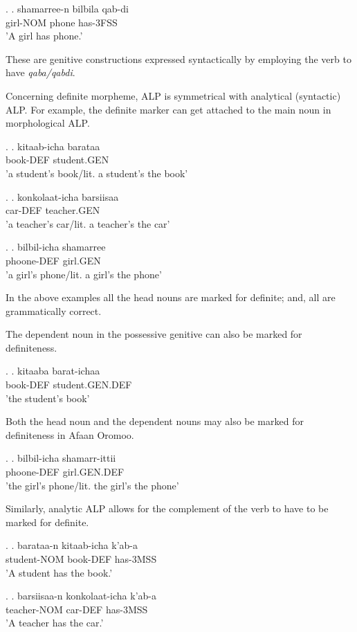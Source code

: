 \documentclass[11pt,a4paper]{article}
\begin{document}
	\ex.
	\ag.
	shamarree-n bilbila qab-di\\
	girl-NOM phone has-3FSS\\
	'A girl has phone.'
	
	These are genitive constructions expressed syntactically by employing the verb to have \emph{qaba/qabdi}.
	
	Concerning definite morpheme,  ALP is symmetrical with analytical (syntactic) ALP. For example, the definite marker can get attached to the main noun in morphological ALP. 
	
	\ex.
	\ag.
	kitaab-icha barataa\\
	book-DEF student.GEN\\
	'a student's book/lit. a student's the book'
	
	\ex.
	\ag.
	konkolaat-icha barsiisaa\\
	car-DEF teacher.GEN\\
	'a teacher's car/lit. a teacher's the car'
	
	\ex.
	\ag.
	bilbil-icha shamarree\\
	phoone-DEF girl.GEN\\
	'a girl's phone/lit. a girl's the phone'
	
	In the above examples all the head nouns are marked for definite; and, all are grammatically correct. 
	
	The dependent noun in the possessive genitive can also be marked for definiteness. 
	
	\ex.
	\ag.
	kitaaba barat-ichaa\\
	book-DEF student.GEN.DEF\\
	'the student's book'
	
	Both the head noun and the dependent nouns may also be marked for definiteness in Afaan Oromoo.
	
	\ex.
	\ag.
	bilbil-icha shamarr-ittii\\
	phoone-DEF girl.GEN.DEF\\
	'the girl's phone/lit. the girl's the phone'
	
	Similarly, analytic ALP allows for the complement of the verb to have to be marked for definite. 
	
	\ex.
	\ag.
	barataa-n kitaab-icha k'ab-a\\
	student-NOM book-DEF has-3MSS\\
	'A student has the book.'
	
	\ex.
	\ag.
	barsiisaa-n konkolaat-icha k'ab-a\\
	teacher-NOM car-DEF has-3MSS\\
	'A teacher has the car.'
	
\end{document}

